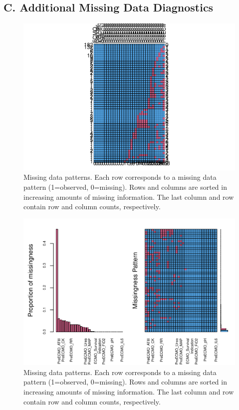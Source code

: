 \documentclass[12pt,]{article}
\begin{document}
\subsection{C. Additional Missing Data
Diagnostics}\label{c.-additional-missing-data-diagnostics}

\begin{figure}[H]

{\centering \includegraphics[width=1\linewidth]{figure/graphics-unnamed-chunk-15-1} 

}

\caption{\label{fig:missing-data-patterns1}Missing data patterns.  Each row corresponds to a missing data pattern (1=observed, 0=missing).  Rows and columns are sorted in increasing amounts of missing information.  The last column and row contain row and column counts, respectively.}\label{fig:unnamed-chunk-15}
\end{figure}

\begin{figure}[H]

{\centering \includegraphics[width=1\linewidth]{figure/graphics-unnamed-chunk-16-1} 

}

\caption{\label{fig:missing-data-patterns2}Missing data patterns.  Each row corresponds to a missing data pattern (1=observed, 0=missing).  Rows and columns are sorted in increasing amounts of missing information.  The last column and row contain row and column counts, respectively.}\label{fig:unnamed-chunk-16}
\end{figure}
\end{document}
